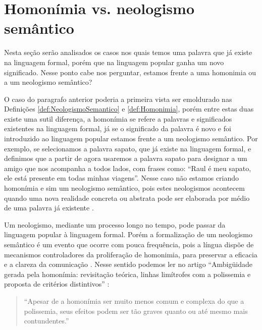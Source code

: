 \section{Homonímia vs. neologismo semântico}
Nesta seção serão analisados os casos nos quais temos uma palavra que já existe na linguagem formal,
porém que na linguagem popular ganha um novo significado. Nesse ponto cabe nos perguntar, 
estamos frente a uma homonimia ou a um neologismo semântico?

O caso do paragrafo anterior poderia a primeira vista ser emoldurado nas Definições \ref{def:NeologismoSemantico} e \ref{def:Homonimia},
porém entre estas duas existe uma sutil diferença, a homonímia se refere a palavras e significados existentes na linguagem formal, 
já se o significado da palavra é novo e foi introduzido ao linguagem popular estamos frente a um neologismo semântico.
Por exemplo, se selecionamos a palavra sapato, que já existe na linguagem formal,
e definimos que a partir de agora usaremos a palavra sapato para designar a um amigo que nos acompanha a todos lados,
com frases como: ``Raul é meu sapato, ele está presente em todas minhas viagens''.
Nesse caso não estamos criando homonímia e sim um neologismo semântico,
pois estes neologismos acontecem quando uma nova realidade concreta ou abstrata pode ser elaborada por médio de uma palavra já existente \cite[pp. 13]{pilla2002neologismos}.

Um neologismo, mediante um processo longo no tempo, pode passar da linguagem popular à linguagem formal. 
Porém a formalização de um neologismo semântico 
é um evento que ocorre com pouca frequência, pois
a língua dispõe de mecanismos controladores da proliferação de homonimia,
para preservar a eficacia e a clareza da comunicação \cite[pp. 13]{pilla2002neologismos}.
Nesse sentido podemos ler no artigo ``Ambigüidade gerada pela homonímia: revisitação teórica, linhas limítrofes com a polissemia e proposta de critérios distintivos'' \cite{ZAVAGLIA2003} \cite{ullmann1973semantica}:
\begin{quotation}
``Apesar de a homonímia ser muito menos comum e complexa do que a polissemia, seus efeitos podem ser tão graves quanto ou até mesmo mais contundentes.''
\end{quotation} 



